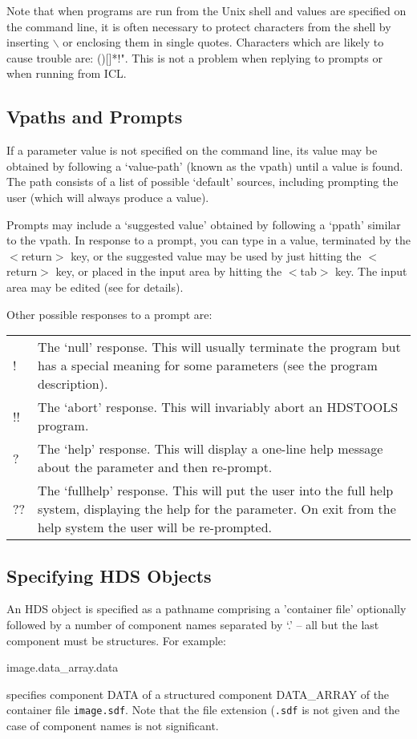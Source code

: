 \documentclass[twoside,11pt,nolof]{starlink}
\begin{document}
Note that when programs are run from the Unix shell and values are specified
on the command line, it is often necessary to protect characters from the
shell by inserting $\backslash$ or enclosing them in single quotes.
Characters which are likely to cause trouble are: ()[]*!".
This is not a problem when replying to prompts or when running from ICL.

\subsection{Vpaths and Prompts}
If a parameter value is not specified on the command line, its value may be
obtained by following a `value-path' (known as the vpath) until a value is
found. The path consists of a list of possible `default' sources, including
prompting the user (which will always produce a value).

Prompts may include a `suggested value' obtained by
following a `ppath' similar to the vpath.
In response to a prompt, you can type in a value, terminated by the
$<$return$>$ key, or the suggested value may be used by just
hitting the $<$return$>$ key, or placed in the input area by hitting the
$<$tab$>$
key. The input area may be edited (see
for details).

Other possible responses to a prompt are:\\
\begin{tabular}{p{.25in}p{5.25in}}
! & The `null' response. This will usually terminate the program but has a
special meaning for some parameters (see the program description).\\
!! & The `abort' response. This will invariably abort an HDSTOOLS program.\\
? & The `help' response. This will display a one-line help message about
the parameter and then re-prompt.\\
?? & The `fullhelp' response. This will put the user into the full help
system, displaying the help for the parameter. On exit from the help system
the user will be re-prompted.
\end{tabular}

\subsection{\label{specifying_hds_objects}Specifying HDS Objects}
An HDS object is specified as a pathname comprising a 'container file'
optionally followed by a number of component names separated by `.' -- all but
the last component must be structures. For example:
\begin{terminalv}
image.data_array.data
\end{terminalv}
specifies component DATA of a structured component DATA\_ARRAY of the
container file \texttt{image.sdf}. Note that the file extension (\texttt{.sdf}
is not given and the case of component names is not significant.
\end{document}

